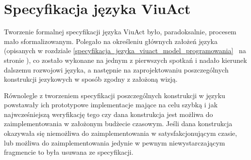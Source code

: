 \section{Specyfikacja języka ViuAct}

Tworzenie formalnej specyfikacji języka ViuAct było, paradoksalnie, procesem
mało sformalizowanym. Polegało na określeniu głównych założeń języka (opisanych
w rozdziale
\ref{specyfikacja_jezyka_viuact_model_programowania}~
na stronie \pageref{specyfikacja_jezyka_viuact_model_programowania}), co zostało
wykonane na jednym z pierwszych spotkań i nadało kierunek dalszemu rozwojowi
języka, a następnie na zaprojektowaniu poszczególnych konstrukcji jezykowych w
sposób zgodny z założoną wizją.

Równolegle z tworzeniem specyfikacji poszczególnych konstrukcji w języku
powstawały ich prototypowe implementacje mające na celu szybką i jak
najwcześniejszą weryfikację tego czy dana konstrukcja jest możliwa do
zaimplementowania w założonym budżecie czasowym. Jeśli dana konstrukcja
okazywała się niemożliwa do zaimplementowania w satysfakcjonującym czasie, lub
możliwa do zaimplementowania jedynie w pewnym niewystarczającym fragmencie to
była usuwana ze specyfikacji.
